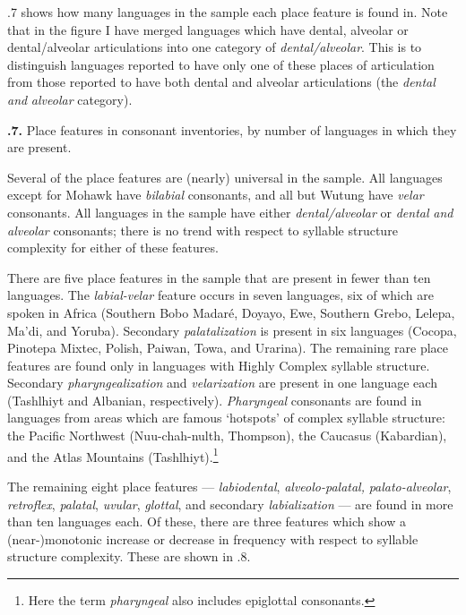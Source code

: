   .7 shows how many languages in the sample each place feature is found in. Note that in the figure I have merged languages which have dental, alveolar or dental/alveolar articulations into one category of \textit{dental/alveolar}. This is to distinguish languages reported to have only one of these places of articulation from those reported to have both dental and alveolar articulations (the \textit{dental} \textit{and} \textit{alveolar} category).

\textbf{.7.} Place features in consonant inventories, by number of languages in which they are present.

  Several of the place features are (nearly) universal in the sample. All languages except for Mohawk have \textit{bilabial} consonants, and all but Wutung have \textit{velar} consonants. All languages in the sample have either \textit{dental/alveolar} or \textit{dental} \textit{and} \textit{alveolar} consonants; there is no trend with respect to syllable structure complexity for either of these features.

  There are five place features in the sample that are present in fewer than ten languages. The \textit{labial-velar} feature occurs in seven languages, six of which are spoken in Africa (Southern Bobo Madaré, Doyayo, Ewe, Southern Grebo, Lelepa, Ma’di, and Yoruba). Secondary \textit{palatalization} is present in six languages (Cocopa, Pinotepa Mixtec, Polish, Paiwan, Towa, and Urarina). The remaining rare place features are found only in languages with Highly Complex syllable structure. Secondary \textit{pharyngealization} and \textit{velarization} are present in one language each (Tashlhiyt and Albanian, respectively). \textit{Pharyngeal} consonants are found in languages from areas which are famous ‘hotspots’ of complex syllable structure: the Pacific Northwest (Nuu-chah-nulth, Thompson), the Caucasus (Kabardian), and the Atlas Mountains (Tashlhiyt).\footnote{ \textrm{Here the term} \textrm{\textit{pharyngeal} }\textrm{also includes epiglottal consonants.}}

  The remaining eight place features — \textit{labiodental}, \textit{alveolo-palatal,} \textit{palato-alveolar}, \textit{retroflex}, \textit{palatal}, \textit{uvular}, \textit{glottal}, and secondary \textit{labialization} — are found in more than ten languages each. Of these, there are three features which show a (near-)monotonic increase or decrease in frequency with respect to syllable structure complexity. These are shown in .8.


